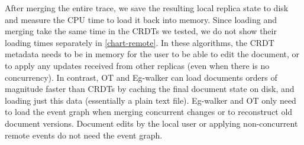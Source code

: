 \documentclass[sigplan,10pt]{acmart}
\newcommand{\algname}{Eg-walker\xspace}
\begin{document}
After merging the entire trace, we save the resulting local replica state to disk and measure the CPU time to load it back into memory.
Since loading and merging take the same time in the CRDTs we tested, we do not show their loading times separately in \autoref{chart-remote}.
In these algorithms, the CRDT metadata needs to be in memory for the user to be able to edit the document, or to apply any updates received from other replicas (even when there is no concurrency).
In contrast, OT and \algname can load documents orders of magnitude faster than CRDTs by caching the final document state on disk, and loading just this data (essentially a plain text file).
\algname and OT only need to load the event graph when merging concurrent changes or to reconstruct old document versions.
Document edits by the local user or applying non-concurrent remote events do not need the event graph.

\end{document}
